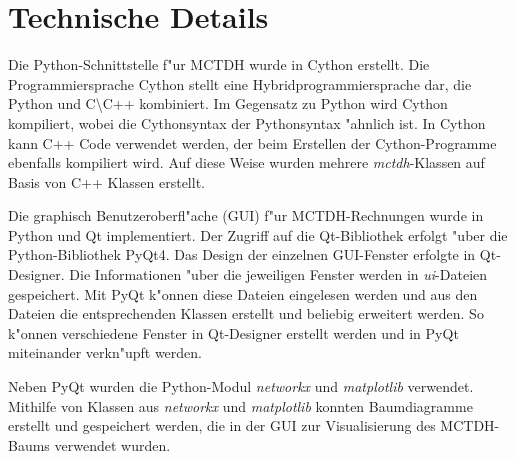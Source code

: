 \chapter{Technische Details}

Die Python-Schnittstelle f"ur MCTDH wurde in Cython erstellt. 
Die Programmiersprache Cython stellt eine Hybridprogrammiersprache dar,
die Python und C\textbackslash C++ kombiniert. Im Gegensatz zu Python
wird Cython kompiliert, wobei die Cythonsyntax der Pythonsyntax "ahnlich ist.
In Cython kann C++ Code verwendet werden, der beim Erstellen der Cython-Programme ebenfalls kompiliert wird.
Auf diese Weise wurden mehrere \textit{mctdh}-Klassen auf Basis von C++ Klassen erstellt.

Die graphisch Benutzeroberfl"ache (GUI) f"ur MCTDH-Rechnungen wurde in Python und Qt implementiert.
Der Zugriff auf die Qt-Bibliothek erfolgt "uber die Python-Bibliothek PyQt4. 
Das Design der einzelnen GUI-Fenster erfolgte in Qt-Designer. Die Informationen "uber 
die jeweiligen Fenster werden in \textit{ui}-Dateien gespeichert. Mit PyQt k"onnen diese Dateien eingelesen werden und aus den Dateien die entsprechenden 
Klassen erstellt und beliebig erweitert werden. So k"onnen
verschiedene Fenster in Qt-Designer erstellt werden und in PyQt miteinander verkn"upft werden.

Neben PyQt wurden die Python-Modul \textit{networkx} und \textit{matplotlib} verwendet.
Mithilfe von Klassen aus \textit{networkx} und \textit{matplotlib} konnten Baumdiagramme erstellt und gespei\-chert werden, die in der GUI zur 
Visualisierung des MCTDH-Baums verwendet wurden.

  




   
